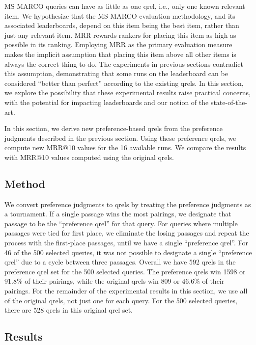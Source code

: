 \documentclass[fullpage]{article}
\begin{document}
MS MARCO queries can have as little as one qrel, i.e., only one known relevant item. We hypothesize that the MS MARCO evaluation methodology, and its associated leaderboards, depend on this item being the best item, rather than just any relevant item. MRR rewards rankers for placing this item as high as possible in its ranking. Employing MRR as the primary evaluation measure makes the implicit assumption that placing this item above all other items is always the correct thing to do. The experiments in previous sections contradict this assumption, demonstrating that some runs on the leaderboard can be considered ``better than perfect'' according to the existing qrels. In this section, we explore the possibility that these experimental results raise practical concerns, with the potential for impacting leaderboards and our notion of the state-of-the-art.

In this section, we derive new preference-based qrels from the preference judgments described in the previous section. Using these preference qrels, we compute new MRR@10 values for the 16 available runs. We compare the results with MRR@10 values computed using the original qrels.

\subsection{Method}

We convert preference judgments to qrels by treating the preference judgments as a tournament. If a single passage wins the most pairings, we designate that passage to be the ``preference qrel'' for that query. For queries where multiple passages were tied for first place, we eliminate the losing passages and repeat the process with the first-place passages, until we have a single ``preference qrel''. For 46 of the 500 selected queries, it was not possible to designate a single ``preference qrel'' due to a cycle between three passages. Overall we have 592 qrels in the preference qrel set for the 500 selected queries. The preference qrels win 1598 or 91.8\% of their pairings, while the original qrels win 809 or 46.6\% of their pairings. For the remainder of the experimental results in this section, we use all of the original qrels, not just one for each query. For the 500 selected queries, there are 528 qrels in this original qrel set.

\subsection{Results}
\end{document}
